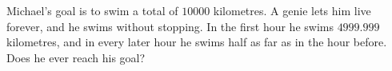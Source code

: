 Michael's goal is to swim a total of $10000$ kilometres. A genie lets him live forever, and he swims without stopping. In the first hour he swims $4999.999$ kilometres, and in every later hour he swims half as far as in the hour before. Does he ever reach his goal?
